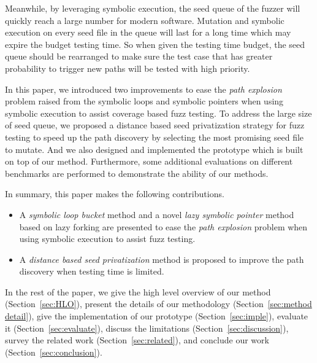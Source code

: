 Meanwhile, by leveraging symbolic execution, the seed queue of the fuzzer will quickly reach a large number for modern software. Mutation and symbolic execution on every seed file in the queue will last for a long time which may expire the budget testing time. So when given the testing time budget, the seed queue should be rearranged to make sure the test case that has greater probability to trigger new paths will be tested with high priority. 

In this paper, we introduced two improvements to ease the \textit{path explosion} problem raised from the symbolic loops and symbolic pointers when using symbolic execution to assist coverage based fuzz testing. To address the large size of seed queue, we proposed a distance based seed privatization strategy for fuzz testing to speed up the path discovery by selecting the most promising seed file to mutate. 
And we also designed and implemented the prototype which is built on top of our method. Furthermore, some additional evaluations on different benchmarks are performed to demonstrate the ability of our methods.

In summary, this paper makes the following contributions.
\begin{itemize}
\item A \emph{symbolic loop bucket} method and a novel \emph{lazy symbolic pointer} method based on lazy forking are presented to ease the \emph{path explosion} problem when using symbolic execution to assist fuzz testing.

\item A \emph{distance based seed privatization} method is proposed to improve the path discovery when testing time is limited.
\end{itemize}

In the rest of the paper, we give the high level overview of our method (Section~\ref{sec:HLO}), present the details of our methodology (Section~\ref{sec:method detail}), give the implementation of our prototype (Section~\ref{sec:imple}), evaluate it (Section~\ref{sec:evaluate}), discuss the limitations (Section~\ref{sec:discussion}), survey the related work (Section~\ref{sec:related}), and conclude our work (Section~\ref{sec:conclusion}).
